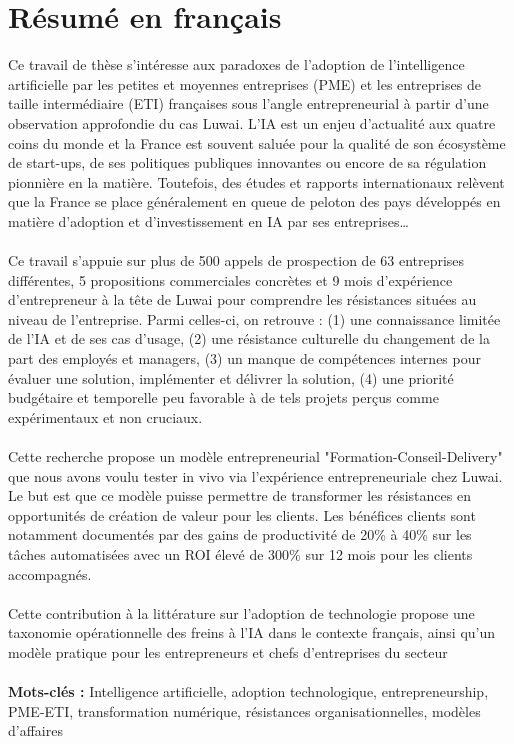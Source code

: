 \section*{Résumé en français}

Ce travail de thèse s'intéresse aux paradoxes de l'adoption de l'intelligence
artificielle par les petites et moyennes entreprises (PME) et les entreprises de
taille intermédiaire (ETI) françaises sous l'angle entrepreneurial à partir d'une
observation approfondie du cas Luwai. L'IA est un enjeu d'actualité aux quatre coins
du monde et la France est souvent saluée pour la qualité de son écosystème de start-ups,
de ses politiques publiques innovantes ou encore de sa régulation pionnière en la matière.
Toutefois, des études et rapports internationaux relèvent que la France se place généralement
en queue de peloton des pays développés en matière d'adoption et d'investissement en IA
par ses entreprises… 
\\\\
Ce travail s’appuie sur plus de 500 appels de prospection de 63
entreprises différentes, 5 propositions commerciales concrètes et 9 mois d’expérience
d’entrepreneur à la tête de Luwai pour comprendre les résistances situées au niveau de
l'entreprise. Parmi celles-ci, on retrouve : (1) une connaissance limitée de l’IA et de
ses cas d’usage, (2) une résistance culturelle du changement de la part des employés et
managers, (3) un manque de compétences internes pour évaluer une solution, implémenter
et délivrer la solution, (4) une priorité budgétaire et temporelle peu favorable à de tels
projets perçus comme expérimentaux et non cruciaux. 
\\\\
Cette recherche propose un modèle
entrepreneurial "Formation-Conseil-Delivery" que nous avons voulu tester in vivo via
l’expérience entrepreneuriale chez Luwai. Le but est que ce modèle puisse permettre de
transformer les résistances en opportunités de création de valeur pour les clients. Les bénéfices clients sont notamment documentés par des gains de
productivité de 20\% à 40\% sur les tâches automatisées avec un ROI élevé de 300\% sur
12 mois pour les clients accompagnés.
\\\\
Cette contribution à la littérature sur l’adoption de technologie propose une
taxonomie opérationnelle des freins à l’IA dans le contexte français, ainsi qu’un modèle
pratique pour les entrepreneurs et chefs d’entreprises du secteur
\\\\
\textbf{Mots-clés :} Intelligence artificielle, adoption technologique, entrepreneurship, PME-ETI, transformation numérique, résistances organisationnelles, modèles d'affaires



